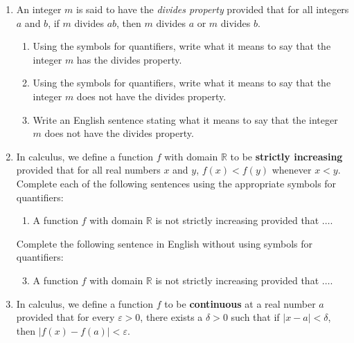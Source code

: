 \begin{enumerate}
\item An integer $m$ is said to have the \emph{divides property} provided that for all integers $a$ and $b$, if $m$ divides $ab$, then $m$ divides $a$ or $m$ divides $b$.
\begin{enumerate}
  \item Using the symbols for quantifiers, write what it means to say that the integer $m$ has the divides property.
  \item Using the symbols for quantifiers, write what it means to say that the integer $m$ does not have the divides property.
  \item Write an English sentence stating what it means to say that the integer $m$ does not have the divides property.
\end{enumerate}


\item In calculus, we define a function  $f$  with domain  $\mathbb{R}$
  to be \textbf{strictly increasing}
%
 provided that for all real numbers  $x$  and  $y$, $f\left( x \right) < f\left( y \right)$ whenever  $x < y$.
\label{exer:24-increasing}%
%
Complete each of the following sentences using the appropriate symbols for quantifiers:
  \begin{enumerate}
    \yitem A function  $f$  with domain  $\mathbb{R}$ is strictly increasing provided that 
$ \ldots .$

  \item A function  $f$  with domain  $\mathbb{R}$ is not strictly increasing provided \linebreak
that $ \ldots .$
\end{enumerate}

Complete the following sentence in English without using symbols for quantifiers:
\begin{enumerate}
\setcounter{enumii}{2}
\item A function  $f$  with domain  $\mathbb{R}$ is not strictly increasing provided 
\linebreak
that $ \ldots .$
  \end{enumerate}
%




\item In calculus, we define a function  $f$  to be \textbf{continuous}
%
 at a real number  $a$  provided that for every  $\varepsilon  > 0$, there exists a  $\delta  > 0$ such that if  $\left| {x - a} \right| < \delta $, then  $\left| {f\left( x \right) - f\left( a \right)} \right| < \varepsilon $.
\label{exer:24-continuous}%


\end{enumerate}

